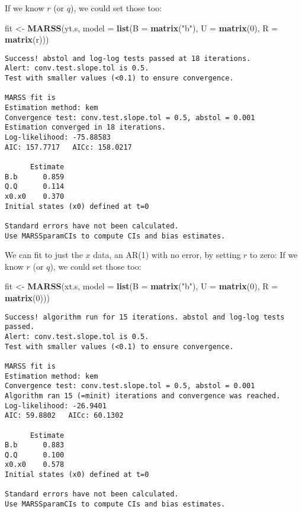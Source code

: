 \documentclass[12pt,]{book}
\newenvironment{Shaded}{\begin{snugshade}}{\end{snugshade}}
\newcommand{\DataTypeTok}[1]{\textcolor[rgb]{0.13,0.29,0.53}{#1}}
\newcommand{\DecValTok}[1]{\textcolor[rgb]{0.00,0.00,0.81}{#1}}
\newcommand{\KeywordTok}[1]{\textcolor[rgb]{0.13,0.29,0.53}{\textbf{#1}}}
\newcommand{\NormalTok}[1]{#1}
\newcommand{\StringTok}[1]{\textcolor[rgb]{0.31,0.60,0.02}{#1}}
\begin{document}
If we know \(r\) (or \(q\)), we could set those too:

\begin{Shaded}
\begin{Highlighting}[]
\NormalTok{fit <-}\StringTok{ }\KeywordTok{MARSS}\NormalTok{(yt.s, }\DataTypeTok{model =} \KeywordTok{list}\NormalTok{(}\DataTypeTok{B =} \KeywordTok{matrix}\NormalTok{(}\StringTok{"b"}\NormalTok{), }\DataTypeTok{U =} \KeywordTok{matrix}\NormalTok{(}\DecValTok{0}\NormalTok{), }
    \DataTypeTok{R =} \KeywordTok{matrix}\NormalTok{(r)))}
\end{Highlighting}
\end{Shaded}

\begin{verbatim}
Success! abstol and log-log tests passed at 18 iterations.
Alert: conv.test.slope.tol is 0.5.
Test with smaller values (<0.1) to ensure convergence.

MARSS fit is
Estimation method: kem 
Convergence test: conv.test.slope.tol = 0.5, abstol = 0.001
Estimation converged in 18 iterations. 
Log-likelihood: -75.88583 
AIC: 157.7717   AICc: 158.0217   
 
      Estimate
B.b      0.859
Q.Q      0.114
x0.x0    0.370
Initial states (x0) defined at t=0

Standard errors have not been calculated. 
Use MARSSparamCIs to compute CIs and bias estimates.
\end{verbatim}

We can fit to just the \(x\) data, an AR(1) with no error, by setting \(r\) to zero:
If we know \(r\) (or \(q\)), we could set those too:

\begin{Shaded}
\begin{Highlighting}[]
\NormalTok{fit <-}\StringTok{ }\KeywordTok{MARSS}\NormalTok{(xt.s, }\DataTypeTok{model =} \KeywordTok{list}\NormalTok{(}\DataTypeTok{B =} \KeywordTok{matrix}\NormalTok{(}\StringTok{"b"}\NormalTok{), }\DataTypeTok{U =} \KeywordTok{matrix}\NormalTok{(}\DecValTok{0}\NormalTok{), }
    \DataTypeTok{R =} \KeywordTok{matrix}\NormalTok{(}\DecValTok{0}\NormalTok{)))}
\end{Highlighting}
\end{Shaded}

\begin{verbatim}
Success! algorithm run for 15 iterations. abstol and log-log tests passed.
Alert: conv.test.slope.tol is 0.5.
Test with smaller values (<0.1) to ensure convergence.

MARSS fit is
Estimation method: kem 
Convergence test: conv.test.slope.tol = 0.5, abstol = 0.001
Algorithm ran 15 (=minit) iterations and convergence was reached. 
Log-likelihood: -26.9401 
AIC: 59.8802   AICc: 60.1302   
 
      Estimate
B.b      0.883
Q.Q      0.100
x0.x0    0.578
Initial states (x0) defined at t=0

Standard errors have not been calculated. 
Use MARSSparamCIs to compute CIs and bias estimates.
\end{verbatim}
\end{document}
